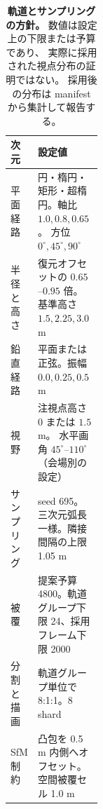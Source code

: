 \begin{table}[t]
  \centering
  \caption{\textbf{軌道とサンプリングの方針。}
  数値は設定上の下限または予算であり、
  実際に採用された視点分布の証明ではない。
  採用後の分布は manifest から集計して報告する。
  }
  \label{tab:data_policy}
  \small
  \begin{tabularx}{\linewidth}{@{}p{0.26\linewidth}X@{}}
    \toprule
    次元 & 設定値 \\
    \midrule
    平面経路 & 円・楕円・矩形・超楕円。軸比 \(1.0,0.8,0.65\)。
      方位 \(0^\circ,45^\circ,90^\circ\) \\
    半径と高さ & 復元オフセットの \(0.65\)--\(0.95\) 倍。
      基準高さ \(1.5,2.25,3.0\) m \\
    鉛直経路 & 平面または正弦。振幅 \(0.0,0.25,0.5\) m \\
    視野 & 注視点高さ \(0\) または \(1.5\) m。
      水平画角 \(45^\circ\)--\(110^\circ\)（会場別の設定） \\
    サンプリング & seed 695。三次元弧長一様。隣接間隔の上限 1.05 m \\
    被覆 & 提案予算 4800。軌道グループ下限 24、採用フレーム下限 2000 \\
    分割と描画 & 軌道グループ単位で 8:1:1。8 shard \\
    SfM 制約 & 凸包を 0.5 m 内側へオフセット。空間被覆セル 1.0 m \\
    \bottomrule
  \end{tabularx}
\end{table}
